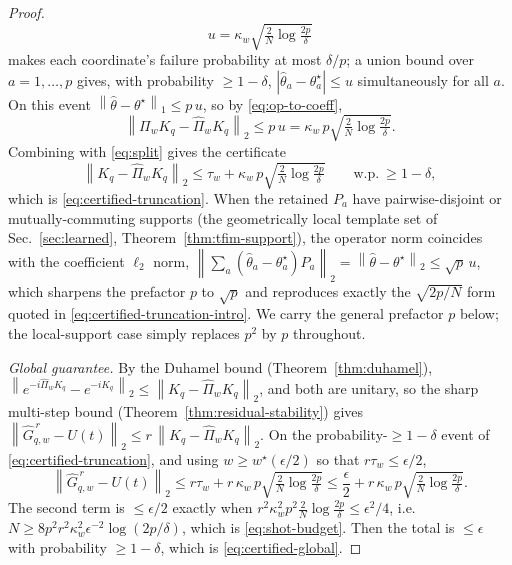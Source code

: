 \documentclass[aps,prxquantum,reprint,superscriptaddress,nofootinbib,amsmath,amssymb]{revtex4-2}
\newcommand{\norm}[1]{\left\lVert #1 \right\rVert}
\newcommand{\abs}[1]{\left\lvert #1 \right\rvert}
\begin{document}
\begin{proof}
\begin{equation*}
    u=\kappa_w\sqrt{\tfrac2N\log\tfrac{2p}{\delta}}
\end{equation*}
makes each coordinate's failure probability at most $\delta/p$; a union bound over $a=1,\dots,p$ gives, with probability $\geq1-\delta$, $\abs{\hat\theta_a-\theta_a^\star}\leq u$ simultaneously for all $a$. On this event $\norm{\hat\theta-\theta^\star}_1\leq p\,u$, so by \eqref{eq:op-to-coeff},
\begin{equation*}
    \norm{\Pi_wK_q-\widehat\Pi_wK_q}_2\leq p\,u=\kappa_w\,p\sqrt{\tfrac2N\log\tfrac{2p}\delta}.
\end{equation*}
Combining with \eqref{eq:split} gives the certificate
\begin{equation*}
    \norm{K_q-\widehat\Pi_wK_q}_2\leq\tau_w+\kappa_w\,p\sqrt{\tfrac2N\log\tfrac{2p}\delta}
    \qquad\text{w.p.}\ \geq1-\delta,
\end{equation*}
which is \eqref{eq:certified-truncation}. When the retained $P_a$ have pairwise-disjoint or mutually-commuting supports (the geometrically local template set of Sec.~\ref{sec:learned}, Theorem~\ref{thm:tfim-support}), the operator norm coincides with the coefficient $\ell_2$ norm, $\norm{\sum_a(\hat\theta_a-\theta^\star_a)P_a}_2=\norm{\hat\theta-\theta^\star}_2\leq\sqrt p\,u$, which sharpens the prefactor $p$ to $\sqrt p$ and reproduces exactly the $\sqrt{2p/N}$ form quoted in \eqref{eq:certified-truncation-intro}. We carry the general prefactor $p$ below; the local-support case simply replaces $p^2$ by $p$ throughout.

\emph{Global guarantee.} By the Duhamel bound (Theorem~\ref{thm:duhamel}), $\norm{e^{-i\widehat\Pi_wK_q}-e^{-iK_q}}_2\leq\norm{K_q-\widehat\Pi_wK_q}_2$, and both are unitary, so the sharp multi-step bound (Theorem~\ref{thm:residual-stability}) gives $\norm{\widehat G_{q,w}^{\,r}-U(t)}_2\leq r\,\norm{K_q-\widehat\Pi_wK_q}_2$. On the probability-$\geq1-\delta$ event of \eqref{eq:certified-truncation}, and using $w\geq w^\star(\epsilon/2)$ so that $r\tau_w\leq\epsilon/2$,
\begin{equation*}
    \norm{\widehat G_{q,w}^{\,r}-U(t)}_2\leq r\tau_w+r\,\kappa_w\,p\sqrt{\tfrac{2}N\log\tfrac{2p}\delta}\leq\frac\epsilon2+r\,\kappa_w\,p\sqrt{\tfrac{2}N\log\tfrac{2p}\delta}.
\end{equation*}
The second term is $\leq\epsilon/2$ exactly when $r^2\kappa_w^2p^2\tfrac{2}N\log\tfrac{2p}\delta\leq\epsilon^2/4$, i.e.\ $N\geq8p^2r^2\kappa_w^2\epsilon^{-2}\log(2p/\delta)$, which is \eqref{eq:shot-budget}. Then the total is $\leq\epsilon$ with probability $\geq1-\delta$, which is \eqref{eq:certified-global}.
\end{proof}
\end{document}

